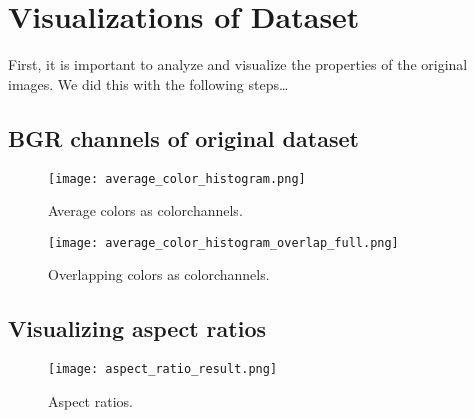 \section{Visualizations of Dataset}
First, it is important to analyze and visualize the properties of the original images. 
We did this with the following steps\dots

\subsection{BGR channels of original dataset}

\begin{figure}[H] %
	\texttt{[image: average\_color\_histogram.png]}
	\caption{Average colors as colorchannels.}
	\label{fig:average_color_histogram} %
\end{figure}

\begin{figure}[H] %
	\texttt{[image: average\_color\_histogram\_overlap\_full.png]}
	\caption{Overlapping colors as colorchannels.}
	\label{fig:average_color_histogram_overlap_full} %
\end{figure}

\newpage
\subsection{Visualizing aspect ratios}

\begin{figure}[H] %
	\texttt{[image: aspect\_ratio\_result.png]}
	\caption{Aspect ratios.}
	\label{fig:aspect_ratio_result} %
\end{figure}

